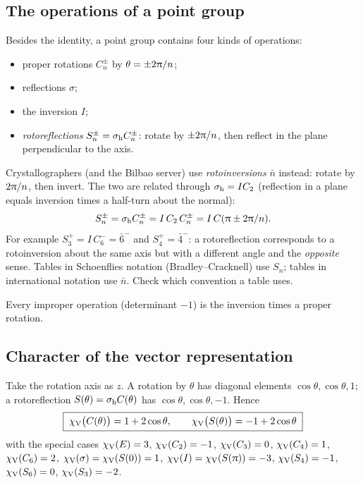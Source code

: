 \subsection{The operations of a point group}
Besides the identity, a point group contains four kinds of operations:
\begin{itemize}
\item proper rotations $C_n^{\pm}$ by $\theta=\pm2\uppi/n$;
\item reflections $\sigma$;
\item the inversion $I$;
\item \emph{rotoreflections} $S_n^{\pm}=\sigma_{\mathrm{h}} C_n^{\pm}$: rotate by $\pm2\uppi/n$, then
      reflect in the plane perpendicular to the axis.
\end{itemize}
Crystallographers (and the Bilbao server) use \emph{rotoinversions} $\bar{n}$ instead:
rotate by $2\uppi/n$, then invert. The two are related through $\sigma_{\mathrm{h}}=I C_2$
(reflection in a plane equals inversion times a half-turn about the normal):
\[
S_n^{\pm}=\sigma_{\mathrm{h}} C_n^{\pm}=I\,C_2\,C_n^{\pm}=I\,C(\uppi\pm2\uppi/n).
\]
For example $S_3^{+}=I\,C_6^{-}=\bar6^{-}$ and $S_4^{+}=\bar4^{-}$: a rotoreflection
corresponds to a rotoinversion about the same axis but with a different angle and the
\emph{opposite} sense. Tables in Schoenflies notation (Bradley--Cracknell) use $S_n$;
tables in international notation use $\bar n$. Check which convention a table uses.

Every improper operation (determinant $-1$) is the inversion times a proper rotation.

\subsection{Character of the vector representation}
Take the rotation axis as $z$. A rotation by $\theta$ has diagonal elements
$\cos\theta,\cos\theta,1$; a rotoreflection $S(\theta)=\sigma_{\mathrm{h}} C(\theta)$ has
$\cos\theta,\cos\theta,-1$. Hence
\begin{equation}\label{eq:chiV}
\boxed{\;\chi_{\mathrm{V}}\bigl(C(\theta)\bigr)=1+2\cos\theta,\qquad
\chi_{\mathrm{V}}\bigl(S(\theta)\bigr)=-1+2\cos\theta\;}
\end{equation}
with the special cases $\chi_{\mathrm{V}}(E)=3$, $\chi_{\mathrm{V}}(C_2)=-1$, $\chi_{\mathrm{V}}(C_3)=0$, $\chi_{\mathrm{V}}(C_4)=1$,
$\chi_{\mathrm{V}}(C_6)=2$, $\chi_{\mathrm{V}}(\sigma)=\chi_{\mathrm{V}}(S(0))=1$, $\chi_{\mathrm{V}}(I)=\chi_{\mathrm{V}}(S(\uppi))=-3$,
$\chi_{\mathrm{V}}(S_4)=-1$, $\chi_{\mathrm{V}}(S_6)=0$, $\chi_{\mathrm{V}}(S_3)=-2$.

